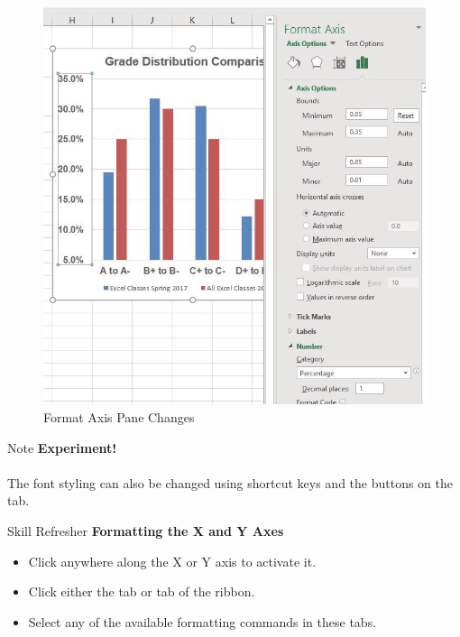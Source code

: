 \begin{figure}[H]
	\centering
	\includegraphics[width=\maxwidth{.95\linewidth}]{gfx/ch04_fig29}
	\caption{Format Axis Pane Changes}
	\label{04:fig29}
\end{figure}

\begin{center}
	\begin{infobox}{Note}
		\textbf{Experiment!}
		\\
		\\
		The font styling can also be changed using shortcut keys and the buttons on the  tab.
	\end{infobox}
\end{center}

\begin{center}
	\begin{sklbox}{Skill Refresher}
		\textbf{Formatting the X and Y Axes}
		\\
		\begin{itemize}
			\setlength{\itemsep}{0pt}
			\setlength{\parskip}{0pt}
			\setlength{\parsep}{0pt}

			\item Click anywhere along the X or Y axis to activate it.
			\item Click either the  tab or  tab of the ribbon.
			\item Select any of the available formatting commands in these tabs.
			
		\end{itemize}
	\end{sklbox}
\end{center}

